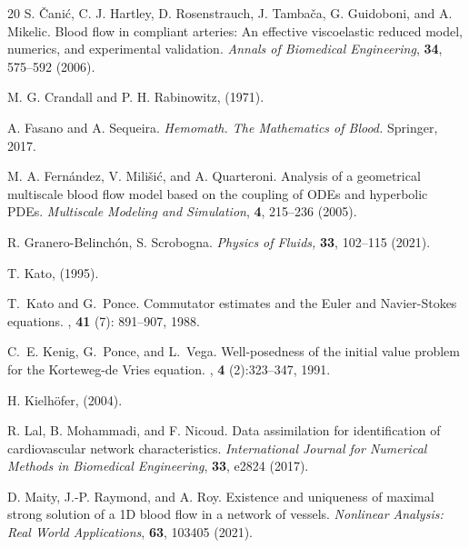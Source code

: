 \documentclass[reqno]{amsart}
\theoremstyle{definition}
\numberwithin{equation}{section}
\numberwithin{theorem}{section}
\numberwithin{definition}{section}
\begin{document}
\begin{thebibliography}{20}
S. Čanić, C. J. Hartley, D. Rosenstrauch, J. Tambača, G. Guidoboni, and A. Mikelic.
\newblock Blood flow in compliant arteries: An effective viscoelastic reduced model, numerics, and experimental validation.
\newblock \textit{Annals of Biomedical Engineering}, \textbf{34}, 575--592 (2006).

M. G. Crandall and P. H. Rabinowitz,
 (1971).

A. Fasano and A. Sequeira.
\newblock \textit{Hemomath. The Mathematics of Blood.}
\newblock Springer, 2017.

M. A. Fernández, V. Milišić, and A. Quarteroni.
\newblock Analysis of a geometrical multiscale blood flow model based on the coupling of ODEs and hyperbolic PDEs.
\newblock \textit{Multiscale Modeling and Simulation}, \textbf{4}, 215--236 (2005).



R. Granero-Belinch\'on, S. Scrobogna. 
\newblock \textit{Physics of Fluids,}  {\bf 33}, 102--115 (2021).

T. Kato,
 (1995).

		T.~Kato and G.~Ponce.
		\newblock Commutator estimates and the {E}uler and {N}avier-{S}tokes equations.
		, \textbf{41} (7): 891--907, 1988.
		
		C.~E. Kenig, G.~Ponce, and L.~Vega.
		\newblock Well-posedness of the initial value problem for the {K}orteweg-de
		{V}ries equation.
		, \textbf{4} (2):323--347, 1991.
		
H. Kielh\"ofer,
 (2004).

R. Lal, B. Mohammadi, and F. Nicoud.
\newblock Data assimilation for identification of cardiovascular network characteristics.
\newblock \textit{International Journal for Numerical Methods in Biomedical Engineering}, \textbf{33}, e2824 (2017).


D. Maity, J.-P. Raymond, and A. Roy.
\newblock Existence and uniqueness of maximal strong solution of a 1D blood flow in a network of vessels.
\newblock \textit{Nonlinear Analysis: Real World Applications}, \textbf{63}, 103405 (2021).


\end{thebibliography}
\end{document}
